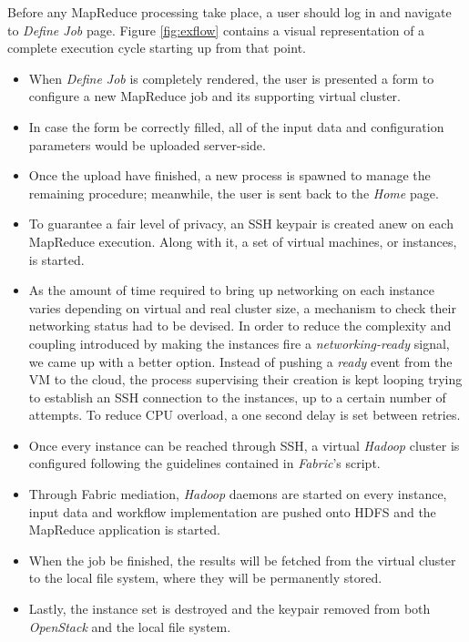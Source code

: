 \documentclass{sig-alternate}
\begin{document}
\noindent Before any MapReduce processing take place, a user should log in and navigate to \emph{Define Job} page. Figure \ref{fig:exflow} contains a visual representation of a complete execution cycle starting up from that point.

\begin{itemize}
 \item When \emph{Define Job} is completely rendered, the user is presented a form to configure a new MapReduce job and its supporting virtual cluster.
 
 \item In case the form be correctly filled, all of the input data and configuration parameters would be uploaded server-side.
 
 \item Once the upload have finished, a new process is spawned to manage the remaining procedure; meanwhile, the user is sent back to the \emph{Home} page.
 
 \item To guarantee a fair level of privacy, an SSH keypair is created anew on each MapReduce execution. Along with it, a set of virtual machines, or instances, is started.
 
 \item As the amount of time required to bring up networking on each instance varies depending on virtual and real cluster size, a mechanism to check their networking status had to be devised. In order to reduce the complexity and coupling introduced by making the instances fire a \emph{networking-ready} signal, we came up with a better option. Instead of pushing a \emph{ready} event from the VM to the cloud, the process supervising their creation is kept looping trying to establish an SSH connection to the instances, up to a certain number of attempts. To reduce CPU overload, a one second delay is set between retries.
 
 \item Once every instance can be reached through SSH, a virtual \emph{Hadoop} cluster is configured following the guidelines contained in \emph{Fabric}'s script.
 
 \item Through Fabric mediation, \emph{Hadoop} daemons are started on every instance, input data and workflow implementation are pushed onto HDFS and the MapReduce application is started.
 
 \item When the job be finished, the results will be fetched from the virtual cluster to the local file system, where they will be permanently stored.
 
 \item Lastly, the instance set is destroyed and the keypair removed from both \emph{OpenStack} and the local file system.
\end{itemize}
\end{document}

